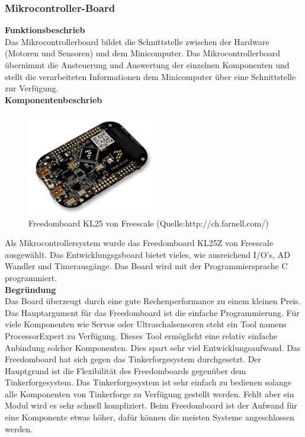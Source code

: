 \subsubsection{Mikrocontroller-Board}
\textbf{Funktionsbeschrieb}\\[0.2cm]
Das Mikrocontrollerboard bildet die Schnittstelle zwischen der Hardware (Motoren und Sensoren) und dem Minicomputer. Das Mikrocontrollerboard übernimmt die Ansteuerung und Auswertung der einzelnen Komponenten und stellt die verarbeiteten Informationen dem Minicomputer über eine Schnittstelle zur Verfügung. \\[0.2cm]
\textbf{Komponentenbeschrieb}
\begin{figure}[H]
	\centering
	\includegraphics[width=0.5\textwidth]{03_Loesungskonzept/pictures/freedomboard.png}
	\caption{Freedomboard KL25 von Freescale (Quelle:http://ch.farnell.com/)}
\end{figure}\flushleft
Als Mikrocontrollersystem wurde das Freedomboard KL25Z von Freescale ausgewählt. Das Entwicklungsgsboard bietet vieles, wie ausreichend I/O's, AD Wandler und Timerausgänge. Das Board wird mit der Programmiersprache C programmiert. \\[0.2cm]
\textbf{Begründung}\\[0.2cm]
Das Board überzeugt durch eine gute Rechenperformance zu einem kleinen Preis. Das Hauptargument für das Freedomboard ist die einfache Programmierung. Für viele Komponenten wie Servos oder Ultraschalsensoren steht ein Tool namens ProcessorExpert zu Verfügung. Dieses Tool ermöglicht eine relativ einfache Anbindung solcher Komponenten. Dies spart sehr viel Entwicklungsaufwand.
Das Freedomboard hat sich gegen das Tinkerforgesystem durchgesetzt. Der Hauptgrund ist die Flexibilität des Freedomboards gegenüber dem Tinkerforgesystem. Das Tinkerforgesystem ist sehr einfach zu bedienen solange alle Komponenten von Tinkerforge zu Verfügung gestellt werden. Fehlt aber ein Modul wird es sehr schnell kompliziert. Beim Freedomboard ist der Aufwand für eine Komponente etwas höher, dafür können die meisten Systeme angeschlossen werden.\\[0.2cm]
